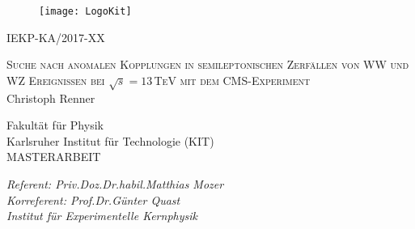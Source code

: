 \begin{titlepage}
  \begin{addmargin}[0cm]{0cm}
    \thispagestyle{empty}
    \vspace{-1cm}
    \begin{center}

	\begin{figure}[htbp]
  		\centering
  		\hspace{26pt}
  		\texttt{[image: LogoKit]}
	\end{figure}

	\hspace{8cm}IEKP-KA/2017-XX\\%

\vspace{0.8cm}

  \Large{\textsc{Suche nach anomalen Kopplungen in semileptonischen Zerf\"allen von WW und WZ Ereignissen bei $\sqrt{s}=13$\,TeV mit dem CMS-Experiment}}\\

\vspace{0.9cm}
\Large{Christoph Renner}\\
\vspace{0.9cm}
\vspace{1cm}
\large{Fakult\"at f\"ur Physik\\
  
  Karlsruher Institut f\"ur Technologie (KIT)\\
  \vspace{0.825 cm}
  \large{MASTERARBEIT}\\
  \vspace{0.825 cm}

  \large{\textit{Referent: Priv.\;Doz.\;Dr.\;habil.\;Matthias Mozer}}\\
  \large{\textit{Korreferent: Prof.\;Dr.\;G\"unter Quast}}\\
   \vspace{0.2 cm}
\large{\textit{Institut f\"ur Experimentelle Kernphysik}}\\


}
\end{center}
\end{addmargin}
\end{titlepage}
